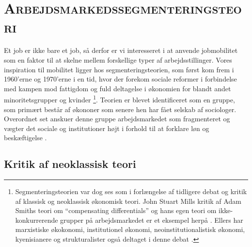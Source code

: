 

\newpage \section{\textsc{Arbejdsmarkedssegmenteringsteori} \label{}}

Et job er ikke bare et job, så derfor er vi interesseret i at anvende jobmobilitet som en faktor til at skelne mellem forskellige typer af arbejdsstillinger. Vores inspiration til mobilitet ligger hos segmenteringsteorien, som først kom frem i 1960'erne og 1970'erne i en tid, hvor der forekom sociale reformer i forbindelse med kampen mod fattigdom og fuld deltagelse i økonomien for blandt andet minoritetsgrupper og kvinder \parencite[1216]{Cain1976}\footnote{Segmenteringsteorien var dog ses som i forlængelse af tidligere debat og kritik af klassisk og neoklassisk økonomisk teori. John Stuart Mills kritik af Adam Smiths teori om “compensating differentials” og hans egen teori om ikke-konkurrerende grupper på arbejdsmarkedet er et eksempel herpå \parencite[1224]{Cain1976}. Ellers har marxistiske økokonomi, institutionel økonomi, neoinstitutionalistisk økonomi, kyenisianere og strukturalister også deltaget i denne debat \parencite[1226ff]{Cain1976}.}. Teorien er blevet identificeret som en gruppe, som primært består af økononer som senere hen har fået selskab af sociologer. Overordnet set anskuer denne gruppe arbejdsmarkedet som fragmenteret og vægter det sociale og institutioner højt i forhold til at forklare løn og beskæftigelse \parencite[63]{Leontaridi1998}.


\subsection{Kritik af neoklassisk teori}

